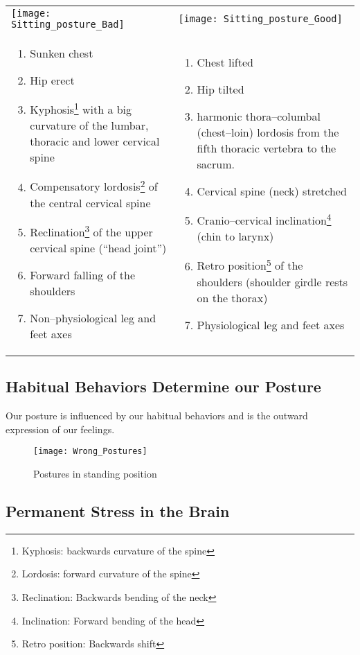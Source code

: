 \documentclass[../main.tex]{subfiles}
\begin{document}
\begin{minipage}{\textwidth}
\begin{tabular}{p{6.3cm}p{6.3cm}}
  \texttt{[image: Sitting\_posture\_Bad]} &

\texttt{[image: Sitting\_posture\_Good]} \\

  \begin{enumerate}
\item {Sunken chest}
\item Hip erect
\item Kyphosis\footnote{Kyphosis: backwards curvature of the spine} with a big {curvature} of the lumbar, thoracic and lower cervical {spine}
\item Compensatory lordosis\footnote{Lordosis: forward curvature of the spine}
  of the central cervical spine
\item Reclination\footnote{Reclination: Backwards bending of the neck}
  of the upper cervical spine (``head joint'')
\item {Forward falling of the shoulders}
\item Non--physiological leg and feet axes
    \end{enumerate} &

  \begin{enumerate}
\item {Chest lifted}
\item Hip tilted
\item harmonic thora--columbal (chest--loin) {lordosis} from the fifth thoracic vertebra to the sacrum.
\item Cervical spine (neck) stretched
\item Cranio--cervical inclination\footnote{Inclination: Forward bending of the head} ({chin to larynx})
\item Retro position\footnote{Retro position: Backwards shift} of the shoulders ({shoulder girdle rests on the thorax})
\item Physiological leg and feet axes

    \end{enumerate}
\\
  
  \end{tabular}
\end{minipage}

\newpage
\subsection{Habitual Behaviors Determine our Posture}

Our posture is influenced by our habitual behaviors and is the outward expression of our feelings.
\begin{figure}[h!]
  \centering
  \texttt{[image: Wrong\_Postures]}
  \caption{Postures in standing position}
\end{figure}
\newpage

\subsection{Permanent Stress in the Brain}
\end{document}

